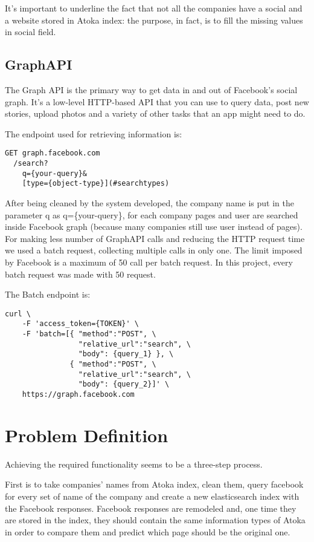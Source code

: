 It's important to underline the fact that not all the companies have a social and a website stored in Atoka index: the purpose, in fact, is to fill the missing values in social field.

\subsection{GraphAPI} 

The Graph API is the primary way to get data in and out of Facebook's social graph\cite{graphapi}. It's a low-level HTTP-based API that you can use to query data, post new stories, upload photos and a variety of other tasks that an app might need to do.

The endpoint used for retrieving information is:
\begin{verbatim}
GET graph.facebook.com
  /search?
    q={your-query}&
    [type={object-type}](#searchtypes)
\end{verbatim}

After being cleaned by the system developed, the company name is put in the parameter q as q=\{your-query\}, for each company pages and user are searched inside Facebook graph (because many companies still use user instead of pages).
For making less number of GraphAPI calls and reducing the HTTP request time we used a batch request, collecting multiple calls in only one. The limit imposed by Facebook is a maximum of 50 call per batch request. In this project, every batch request was made with 50 request.

The Batch endpoint is:
\begin{verbatim}
curl \
    -F 'access_token={TOKEN}' \
    -F 'batch=[{ "method":"POST", \
                 "relative_url":"search", \
                 "body": {query_1} }, \
               { "method":"POST", \
                 "relative_url":"search", \
                 "body": {query_2}]' \
    https://graph.facebook.com
\end{verbatim}

%
%
%
%
%
%

\section{Problem Definition}
Achieving the required functionality seems to be a three-step process. 

First is to take companies' names from Atoka index, clean them, query facebook for every set of name of the company and create a new elasticsearch index with the Facebook responses. Facebook responses are remodeled and, one time they are stored in the index, they should contain the same information types of Atoka in order to compare them and predict which page should be the original one.

